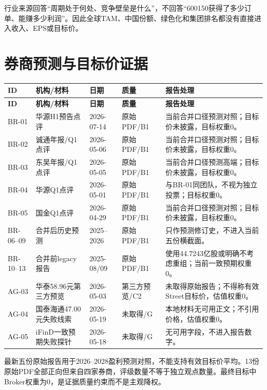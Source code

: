 行业来源回答“周期处于何处、竞争壁垒是什么”，不回答“600150获得了多少订单、能赚多少利润”。因此全球TAM、中国份额、绿色化和集团排名都没有直接进入收入、EPS或目标价。

\section{券商预测与目标价证据}

\small
\begin{longtable}{L{1.7cm} L{3.0cm} L{2.2cm} L{2.4cm} L{6.0cm}}
\toprule
\textbf{ID} & \textbf{机构/材料} & \textbf{日期} & \textbf{质量} & \textbf{报告处理} \\
\midrule
\endfirsthead
\toprule
\textbf{ID} & \textbf{机构/材料} & \textbf{日期} & \textbf{质量} & \textbf{报告处理} \\
\midrule
\endhead
BR-01 & 华源H1预告点评 & 2026-07-14 & 原始PDF/B1 & 当前合并口径预测对照；目标价未披露，目标权重0。 \\
BR-02 & 诚通年报/Q1点评 & 2026-05-06 & 原始PDF/B1 & 当前合并口径预测对照；目标价未披露，目标权重0。 \\
BR-03 & 东吴年报/Q1点评 & 2026-05-05 & 原始PDF/B1 & 当前合并口径预测高端；目标价未披露，目标权重0。 \\
BR-04 & 华源Q1点评 & 2026-05-01 & 原始PDF/B1 & 与BR-01同团队，不视为独立投票；目标权重0。 \\
BR-05 & 国金Q1点评 & 2026-04-29 & 原始PDF/B1 & 当前合并口径预测对照；目标价未披露，目标权重0。 \\
BR-06--09 & 合并后历史预测 & 2025--2026 & 原始PDF/B1 & 只作预测修订史，不进入当前五份横截面。 \\
BR-10--13 & 合并前legacy报告 & 2025-08/09 & 原始PDF/B1 & 使用44.7243亿股或明确不考虑重组；当前一致预期权重0。 \\
AG-03 & 华泰58.96元第三方预览 & 2026-05-03 & 第三方预览/C2 & 未取得原始报告；不得称有效Street目标价，估值权重0。 \\
AG-04 & 国泰海通47.00元失败线索 & 2026-05-19 & 未取得/G & 本地材料无可用正文；不引用价格，估值权重0。 \\
AG-05 & iFinD一致预期失败探针 & 2026-05-18 & 未取得/G & 无可用字段，不进入报告数字。 \\
\bottomrule
\end{longtable}
\normalsize

最新五份原始报告用于2026--2028盈利预测对照，不能支持有效目标价平均。13份原始PDF全部正向但来自四家券商，评级数量不等于独立观点数量。最终目标中Broker权重为0，是证据质量约束而不是主观降权。

